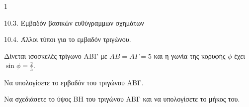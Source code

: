 \begin{ylh}{1}
    \item 10.3. Εμβαδόν βασικών ευθύγραμμων σχημάτων
    \item 10.4. Άλλοι τύποι για το εμβαδόν τριγώνου.
\end{ylh}
\begin{figure}
    \centering
\end{figure}
Δίνεται ισοσκελές τρίγωνο ΑΒΓ με $AB = A\Gamma = 5$ και η γωνία της κορυφής $\phi$ έχει $\sin\phi = \frac{2}{5}$.
\begin{alist}
\item Να υπολογίσετε το εμβαδόν του τριγώνου ΑΒΓ. 
\item Να σχεδιάσετε το ύψος BH του τριγώνου ΑΒΓ και να υπολογίσετε το μήκος του. 
\end{alist}